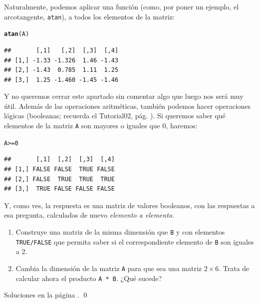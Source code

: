 \documentclass[10pt,a4paper]{article}\usepackage[]{graphicx}\usepackage[]{color}
\makeatletter
\newcommand{\hlnum}[1]{\textcolor[rgb]{0.686,0.059,0.569}{#1}}%
\newcommand{\hlopt}[1]{\textcolor[rgb]{0,0,0}{#1}}%
\newcommand{\hlstd}[1]{\textcolor[rgb]{0.345,0.345,0.345}{#1}}%
\newcommand{\hlkwd}[1]{\textcolor[rgb]{0.737,0.353,0.396}{\textbf{#1}}}%
\newenvironment{kframe}{%
 \def\at@end@of@kframe{}%
 \ifinner\ifhmode%
  \def\at@end@of@kframe{\end{minipage}}%
  \begin{minipage}{\columnwidth}%
 \fi\fi%
 \def\FrameCommand##1{\hskip\@totalleftmargin \hskip-\fboxsep
 \colorbox{shadecolor}{##1}\hskip-\fboxsep
     \hskip-\linewidth \hskip-\@totalleftmargin \hskip\columnwidth}%
 \MakeFramed {\advance\hsize-\width
   \@totalleftmargin\z@ \linewidth\hsize
   \@setminipage}}%
 {\par\unskip\endMakeFramed%
 \at@end@of@kframe}
\newenvironment{knitrout}{}{} %
\makeatother
\begin{document}
Naturalmente, podemos aplicar una función (como, por poner un ejemplo, el arcotangente, {\tt atan}), a todos los elementos de la matriz:
\begin{knitrout}
\color{fgcolor}\begin{kframe}
\begin{alltt}
\hlkwd{atan}\hlstd{(A)}
\end{alltt}
\begin{verbatim}
##       [,1]   [,2]  [,3]  [,4]
## [1,] -1.33 -1.326  1.46 -1.43
## [2,] -1.43  0.785  1.11  1.25
## [3,]  1.25 -1.460 -1.45 -1.46
\end{verbatim}
\end{kframe}
\end{knitrout}
     Y no queremos cerrar este apartado sin comentar algo que luego nos será muy útil. Además de las operaciones aritméticas, también podemos hacer operaciones lógicas (booleanas; recuerda el Tutorial02, pág. \pageref{tut02-tut02:subsubsec:SeleccionElementosCondicionesValoresBooleanosWhich}). Si queremos saber qué elementos de la matriz {\tt A} son mayores o iguales que $0$, haremos:
\begin{knitrout}
\color{fgcolor}\begin{kframe}
\begin{alltt}
\hlstd{A} \hlopt{>=} \hlnum{0}
\end{alltt}
\begin{verbatim}
##       [,1]  [,2]  [,3]  [,4]
## [1,] FALSE FALSE  TRUE FALSE
## [2,] FALSE  TRUE  TRUE  TRUE
## [3,]  TRUE FALSE FALSE FALSE
\end{verbatim}
\end{kframe}
\end{knitrout}
     Y, como ves, la respuesta es una matriz de valores booleanos, con las respuestas a esa pregunta, calculados de nuevo {\em elemento a elemento}.

\begin{ejercicio}
\label{tut03:ejercicio08}
\quad
\begin{enumerate}
\item Construye una matriz de la misma dimensión que {\tt B} y con elementos {\tt TRUE/FALSE} que permita saber si el correspondiente elemento de {\tt B} son iguales a $2$.
\item Cambia la dimensión de la matriz {\tt A} para que sea una matriz $2\times 6$. Trata de calcular ahora el producto {\tt A * B}. ¿Qué sucede?
\end{enumerate}
Soluciones en la página \pageref{tut03:ejercicio08:sol}.
\qed
\end{ejercicio}
\end{document}
